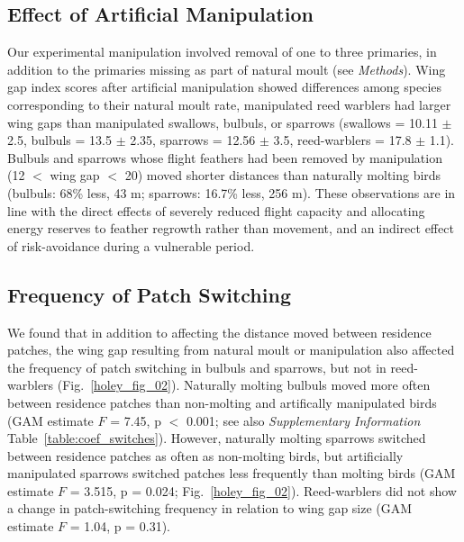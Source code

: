 \subsection*{Effect of Artificial Manipulation}

Our experimental manipulation involved removal of one to three primaries, in addition to the primaries missing as part of natural moult (see \emph{Methods}).
Wing gap index scores after artificial manipulation showed differences among species corresponding to their natural moult rate, manipulated reed warblers had larger wing gaps than manipulated swallows, bulbuls, or sparrows {(swallows = 10.11 $\pm$ 2.5, bulbuls = 13.5 $\pm$ 2.35, sparrows = 12.56 $\pm$ 3.5, reed-warblers = 17.8 $\pm$ 1.1).}
Bulbuls and sparrows whose flight feathers had been removed by manipulation (12 $<$ wing gap $<$ 20) moved shorter distances than naturally molting birds {(bulbuls: 68\% less, 43 m; sparrows: 16.7\% less, 256 m)}.
These observations are in line with the direct effects of severely reduced flight capacity and allocating energy reserves to feather regrowth rather than movement, and an indirect effect of risk-avoidance during a vulnerable period.

\subsection*{Frequency of Patch Switching}

We found that in addition to affecting the distance moved between residence patches, the wing gap resulting from natural moult or manipulation also affected the frequency of patch switching in bulbuls and sparrows, but not in reed-warblers (Fig.~\ref{holey_fig_02}).
Naturally molting bulbuls moved more often between residence patches than non-molting and artifically manipulated birds (GAM estimate $F$ = 7.45, p $<$ 0.001; see also \textit{Supplementary Information} Table~\ref{table:coef_switches}).
However, naturally molting sparrows switched between residence patches as often as non-molting birds, but artificially manipulated sparrows switched patches less frequently than molting birds (GAM estimate $F$ = 3.515, p = 0.024; Fig.~\ref{holey_fig_02}).
Reed-warblers did not show a change in patch-switching frequency in relation to wing gap size (GAM estimate $F$ = 1.04, p = 0.31).

